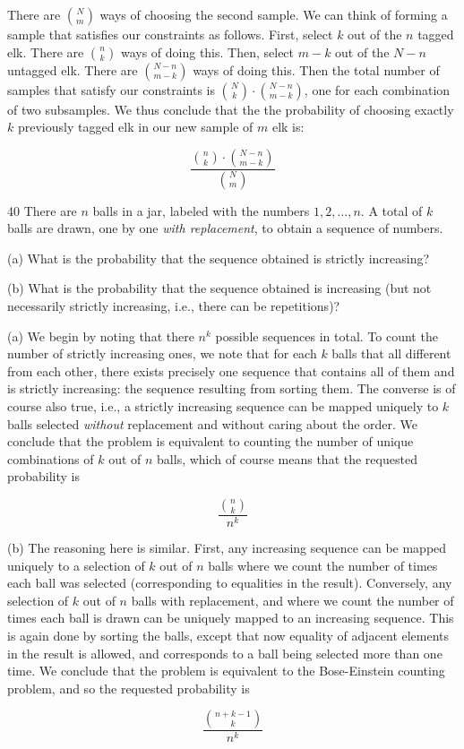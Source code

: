 \begin{solution}
    
    There are $\binom{N}{m}$ ways of choosing the second sample.
    We can think of forming a sample that satisfies our constraints as follows.
    First, select $k$ out of the $n$ tagged elk.
    There are $\binom{n}{k}$ ways of doing this.
    Then, select $m - k$ out of the $N - n$ untagged elk.
    There are $\binom{N - n}{m - k}$ ways of doing this.
    Then the total number of samples that satisfy our constraints is $\binom{N}{k} \cdot \binom{N - n}{m - k}$, one for each combination of two subsamples.
    We thus conclude that the the probability of choosing exactly $k$ previously tagged elk in our new sample of $m$ elk is:

    \[\frac{\binom{n}{k} \cdot \binom{N - n}{m - k}}{\binom{N}{m}}\]

\begin{exercise}{40}
    There are $n$ balls in a jar, labeled with the numbers $1, 2, \ldots, n$.
    A total of $k$ balls are drawn, one by one \textit{with replacement}, to obtain a sequence of numbers.

    (a) What is the probability that the sequence obtained is strictly increasing?

    (b) What is the probability that the sequence obtained is increasing (but not necessarily strictly increasing, i.e., there can be repetitions)?
\end{exercise}

    (a) We begin by noting that there $n^k$ possible sequences in total.
    To count the number of strictly increasing ones, we note that for each $k$ balls that all different from each other, there exists precisely one sequence that contains all of them and is strictly increasing: the sequence resulting from sorting them.
    The converse is of course also true, i.e., a strictly increasing sequence can be mapped uniquely to $k$ balls selected \textit{without} replacement and without caring about the order.
    We conclude that the problem is equivalent to counting the number of unique combinations of $k$ out of $n$ balls, which of course means that the requested probability is

    \[\frac{\binom{n}{k}}{n^k}\]

    (b) The reasoning here is similar.
    First, any increasing sequence can be mapped uniquely to a selection of $k$ out of $n$ balls where we count the number of times each ball was selected (corresponding to equalities in the result).
    Conversely, any selection of $k$ out of $n$ balls with replacement, and where we count the number of times each ball is drawn can be uniquely mapped to an increasing sequence.
    This is again done by sorting the balls, except that now equality of adjacent elements in the result is allowed, and corresponds to a ball being selected more than one time.
    We conclude that the problem is equivalent to the Bose-Einstein counting problem, and so the requested probability is

    \[\frac{\binom{n + k - 1}{k}}{n^k}\]
\end{solution}


